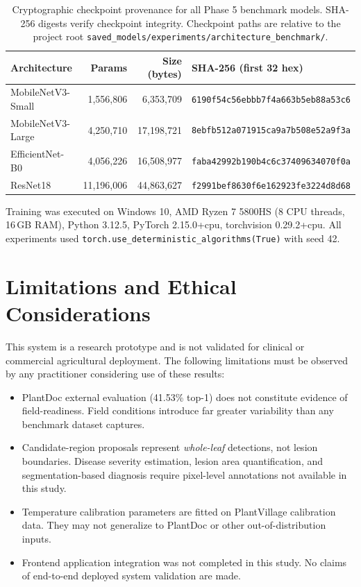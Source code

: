 \documentclass[pdflatex,sn-mathphys-num]{sn-jnl}
\begin{document}
\begin{table}[H]
\caption{Cryptographic checkpoint provenance for all Phase 5 benchmark models.
SHA-256 digests verify checkpoint integrity. Checkpoint paths are relative to the
project root \texttt{saved\_models/experiments/architecture\_benchmark/}.}
\label{tab:checkpoints}
\centering
\small
\begin{tabular}{lrrl}
\toprule
\textbf{Architecture} & \textbf{Params} & \textbf{Size (bytes)} & \textbf{SHA-256 (first 32 hex)} \\
\midrule
MobileNetV3-Small  & 1{,}556{,}806 &  6{,}353{,}709 & \texttt{6190f54c56ebbb7f4a663b5eb88a53c6} \\
MobileNetV3-Large  & 4{,}250{,}710 & 17{,}198{,}721 & \texttt{8ebfb512a071915ca9a7b508e52a9f3a} \\
EfficientNet-B0    & 4{,}056{,}226 & 16{,}508{,}977 & \texttt{faba42992b190b4c6c37409634070f0a} \\
ResNet18           & 11{,}196{,}006 & 44{,}863{,}627 & \texttt{f2991bef8630f6e162923fe3224d8d68} \\
\bottomrule
\end{tabular}
\end{table}

\noindent Training was executed on Windows 10, AMD Ryzen 7 5800HS (8 CPU threads,
16\,GB RAM), Python 3.12.5, PyTorch 2.15.0+cpu, torchvision 0.29.2+cpu.
All experiments used \texttt{torch.use\_deterministic\_algorithms(True)} with seed 42.


\section*{Limitations and Ethical Considerations}

This system is a research prototype and is not validated for clinical or commercial
agricultural deployment. The following limitations must be observed by any practitioner
considering use of these results:
\begin{itemize}
  \item PlantDoc external evaluation (41.53\% top-1) does not constitute evidence of
        field-readiness. Field conditions introduce far greater variability than any
        benchmark dataset captures.
  \item Candidate-region proposals represent \textit{whole-leaf} detections, not
        lesion boundaries. Disease severity estimation, lesion area quantification,
        and segmentation-based diagnosis require pixel-level annotations not available
        in this study.
  \item Temperature calibration parameters are fitted on PlantVillage calibration data.
        They may not generalize to PlantDoc or other out-of-distribution inputs.
  \item Frontend application integration was not completed in this study.
        No claims of end-to-end deployed system validation are made.
\end{itemize}
\end{document}
